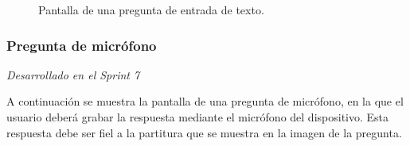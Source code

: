 \begin{figure}[H]
  \caption{Pantalla de una pregunta de entrada de texto. }%
  \label{fig:example}%
\end{figure}

\newpage
\subsubsection{Pregunta de micrófono}

\label{sec:pregunic1}
\textit{Desarrollado en el Sprint 7}

A continuación se muestra la pantalla de una pregunta de micrófono, en la que el usuario deberá grabar la respuesta mediante el micrófono del dispositivo. Esta respuesta
debe ser fiel a la partitura que se muestra en la imagen de la pregunta. 

